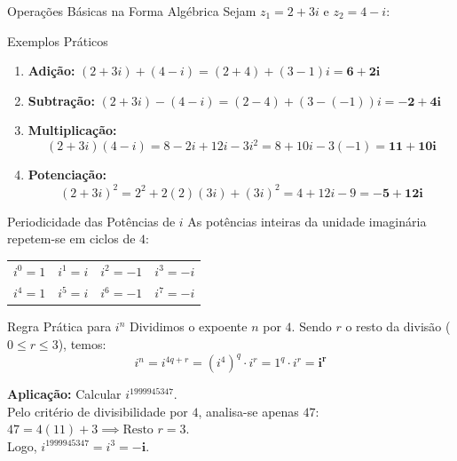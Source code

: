 \documentclass[10pt, aspectratio=169]{beamer}
\begin{document}
\begin{frame}{Operações Básicas na Forma Algébrica}
  Sejam $z_1 = 2 + 3i$ e $z_2 = 4 - i$:

  \begin{exampleblock}{Exemplos Práticos}
    \begin{enumerate}
      \item \textbf{Adição:} $(2 + 3i) + (4 - i) = (2 + 4) + (3 - 1)i = \mathbf{6 + 2i}$
      \item \textbf{Subtração:} $(2 + 3i) - (4 - i) = (2 - 4) + (3 - (-1))i = \mathbf{-2 + 4i}$
      \item \textbf{Multiplicação:}
      \[
      (2 + 3i)(4 - i) = 8 - 2i + 12i - 3i^2 = 8 + 10i - 3(-1) = \mathbf{11 + 10i}
      \]
      \item \textbf{Potenciação:}
      \[
      (2 + 3i)^2 = 2^2 + 2(2)(3i) + (3i)^2 = 4 + 12i - 9 = \mathbf{-5 + 12i}
      \]
    \end{enumerate}
  \end{exampleblock}
\end{frame}

\begin{frame}{Periodicidade das Potências de \texorpdfstring{$i$}{i}}
  As potências inteiras da unidade imaginária repetem-se em ciclos de $4$:

  \begin{table}
    \centering
    \begin{tabular}{cccc}
      \toprule
      $i^0 = 1$ & $i^1 = i$ & $i^2 = -1$ & $i^3 = -i$ \\
      $i^4 = 1$ & $i^5 = i$ & $i^6 = -1$ & $i^7 = -i$ \\
      \bottomrule
    \end{tabular}
  \end{table}

  \begin{block}{Regra Prática para \texorpdfstring{$i^n$}{i\string^n}}
    Dividimos o expoente $n$ por $4$. Sendo $r$ o resto da divisão ($0 \le r \le 3$), temos:
    \[
    i^n = i^{4q + r} = (i^4)^q \cdot i^r = 1^q \cdot i^r = \mathbf{i^r}
    \]
  \end{block}

  \pause
  \textbf{Aplicação:} Calcular $i^{1999945347}$. \\
  Pelo critério de divisibilidade por $4$, analisa-se apenas $47$: $47 = 4(11) + 3 \implies \text{Resto } r = 3$. \\
  Logo, $i^{1999945347} = i^3 = \mathbf{-i}$.
\end{frame}
\end{document}
